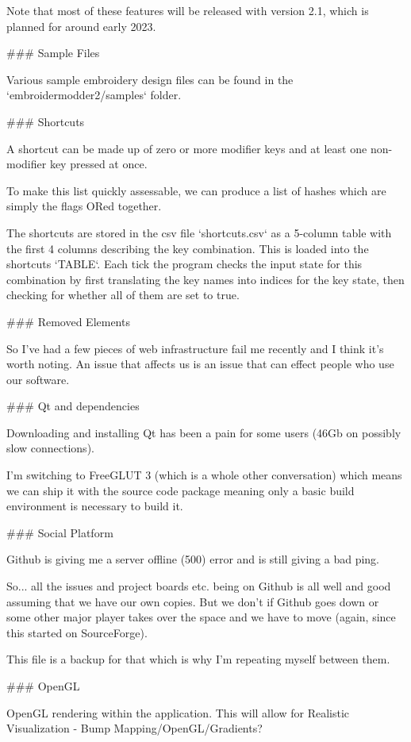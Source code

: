 Note that most of these features will be released with version 2.1, which is planned for around
early 2023.

### Sample Files

Various sample embroidery design files can be found in the
`embroidermodder2/samples` folder.

### Shortcuts

A shortcut can be made up of zero or more modifier keys and at least one non-modifier key
pressed at once.

To make this list quickly assessable, we can produce a list of hashes which are simply the
flags ORed together.

The shortcuts are stored in the csv file `shortcuts.csv` as a 5-column table
with the first 4 columns describing the key combination. This is loaded into
the shortcuts `TABLE`. Each tick the program checks the input state for this
combination by first translating the key names into indices for the key state,
then checking for whether all of them are set to true.

### Removed Elements

So I've had a few pieces of web infrastructure fail me recently and I think
it's worth noting. An issue that affects us is an issue that can effect people
who use our software.

### Qt and dependencies

Downloading and installing Qt has been a pain for some users (46Gb on possibly
slow connections).

I'm switching to FreeGLUT 3 (which is a whole other conversation) which means
we can ship it with the source code package meaning only a basic build
environment is necessary to build it.

### Social Platform

Github is giving me a server offline (500) error and is still giving a bad ping.

So... all the issues and project boards etc. being on Github is all well and
good assuming that we have our own copies. But we don't if Github goes down or
some other major player takes over the space and we have to move (again, since
this started on SourceForge).

This file is a backup for that which is why I'm repeating myself between them.

### OpenGL

OpenGL rendering within the application. This will allow for Realistic Visualization - Bump
Mapping/OpenGL/Gradients?


